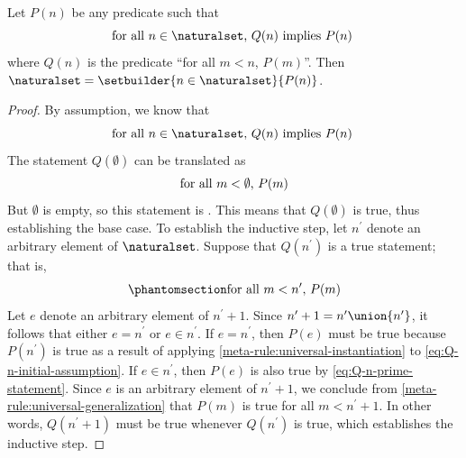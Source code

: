 \begin{thm}
     \label{thm:metatheory-strong-induction}
    Let \( P(n) \) be any predicate such that
    \begin{equation*}
        \text{for all \( n \in \naturalset \), \( Q(n) \) implies \( P(n) \) }
    \end{equation*}
    where \( Q(n) \) is the predicate ``for all \( m < n \), \( P(m) \)''.
    Then \( \naturalset = \setbuilder{n \in \naturalset}{P(n)} \).
\end{thm}

\begin{proof}
    By assumption, we know that
    \begin{equation}
        \label{eq:Q-n-initial-assumption}
        \text{for all \( n \in \naturalset \), \( Q(n) \) implies \( P(n) \) }
    \end{equation}
    The statement \( Q(\emptyset) \) can be translated as
    \begin{equation*}
        \text{for all \( m < \emptyset \), \( P(m) \)}
    \end{equation*}
    But \( \emptyset \) is empty, so this statement is .
    This means that \( Q(\emptyset) \) is true, thus establishing the base case.
    To establish the inductive step, let \( n^{\prime} \) denote an arbitrary element of \( \naturalset \).
    Suppose that \( Q(n^{\prime}) \) is a true statement; that is,
    \begin{equation}
        \phantomsection \label{eq:Q-n-prime-statement}
        \text{for all \( m < n^{\prime} \), \( P(m) \)}
    \end{equation}
    Let \( e \) denote an arbitrary element of \( n^{\prime} + 1 \).
    Since \( n^{\prime} + 1 = n^{\prime} \union \mleft\{ n^{\prime} \mright\} \), it follows that either \( e = n^{\prime} \) or \( e \in n^{\prime} \).
    If \( e = n^{\prime} \), then \( P(e) \) must be true because \( P(n^{\prime}) \) is true as a result of applying
    \cref{meta-rule:universal-instantiation} to \eqref{eq:Q-n-initial-assumption}.
    If \( e \in n^{\prime} \), then \( P(e) \) is also true by \eqref{eq:Q-n-prime-statement}.
    Since \( e \) is an arbitrary element of \( n^{\prime} + 1 \), we conclude from \cref{meta-rule:universal-generalization}
    that \( P(m) \) is true for all \( m < n^{\prime} + 1 \).
    In other words, \( Q(n^{\prime} + 1) \) must be true whenever \( Q(n^{\prime}) \) is true, which establishes the inductive step.

\end{proof}
